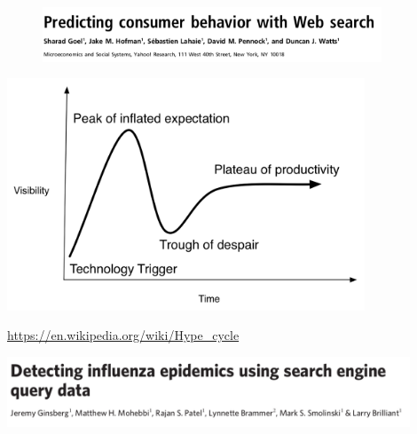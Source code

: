 \documentclass[aspectratio=169]{beamer}
\begin{document}
\begin{frame}

\begin{figure}
  \includegraphics[width = 0.9\textwidth]{figures/goel_predicting_2010_title}
\end{figure}

\end{frame}
\begin{frame}

\begin{center}
  \includegraphics[width = 0.8\textwidth]{figures/hype_cycle}
\end{center}

\vfill
\url{https://en.wikipedia.org/wiki/Hype_cycle}

\end{frame}
\begin{frame}

\begin{center}
  \includegraphics[width = 0.9\textwidth]{figures/ginsburg_detecting_2008_title}
\end{center}

\end{frame}
\end{document}

